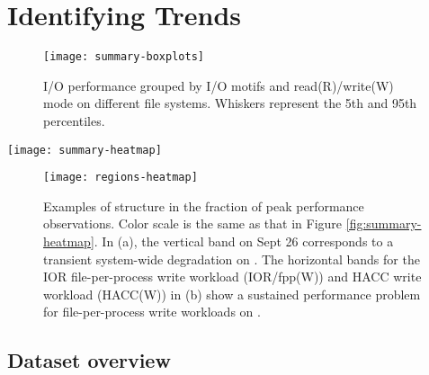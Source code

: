 \section{Identifying Trends}  \label{sec:features}

\begin{figure}
    \centering
    \texttt{[image: summary-boxplots]}
    \vspace{-.15in}
    \caption{I/O performance grouped by I/O motifs and read(R)/write(W) mode on different file systems.  Whiskers represent the 5th and 95th percentiles.}
    \label{fig:summary-boxplots}
\end{figure}

\begin{figure*}
    \centering
    \texttt{[image: summary-heatmap]}
    \vspace{-.2in}
    \caption{Performance of daily probes normalized to the peak observed performance for each probe type (I/O motif and read/write mode combination) on the specified system.  The y-axis labels show combinations of system, I/O motif, and mode (Read/Write).  Grey represents days on which no observations were made.  The two regions highlighted in green boxes are expanded upon in Figure \ref{fig:regions-heatmap}.}
    \label{fig:summary-heatmap}
\end{figure*}

\begin{figure}
    \centering
    \texttt{[image: regions-heatmap]}
    \vspace{-.2in}
    \caption{Examples of structure in the fraction of peak performance observations.  Color scale is the same as that in Figure \ref{fig:summary-heatmap}.  In (a), the vertical band on Sept 26 corresponds to a transient system-wide degradation on \mira.  The horizontal bands for the IOR file-per-process write workload (IOR/fpp(W)) and HACC write workload (HACC(W)) in (b) show a sustained performance problem for file-per-process write workloads on \cori.}
    \label{fig:regions-heatmap}
\end{figure}



\subsection{Dataset overview} \label{sec:features/summary}


